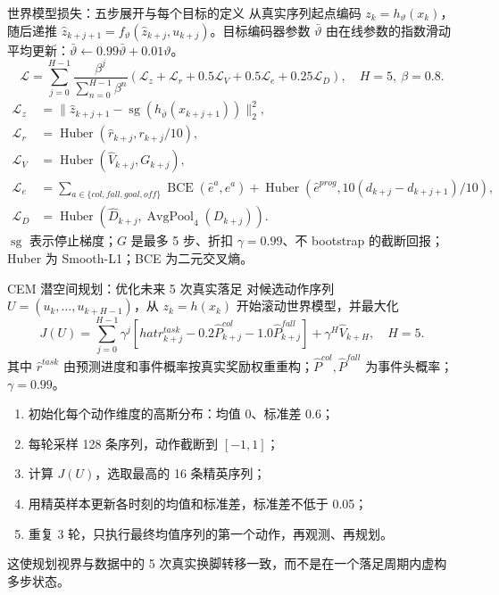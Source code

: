 \documentclass[aspectratio=169,10pt]{beamer}
\begin{document}
\begin{frame}{世界模型损失：五步展开与每个目标的定义}
\scriptsize
从真实序列起点编码 $z_k=h_\vartheta(x_k)$，随后递推 $\hat z_{k+j+1}=f_\vartheta(\hat z_{k+j},u_{k+j})$。目标编码器参数 $\bar\vartheta$ 由在线参数的指数滑动平均更新：$\bar\vartheta\leftarrow0.99\bar\vartheta+0.01\vartheta$。
\[
\mathcal L=\sum_{j=0}^{H-1}\frac{\beta^j}{\sum_{n=0}^{H-1}\beta^n}
\left(\mathcal L_z+\mathcal L_r+0.5\mathcal L_V+0.5\mathcal L_e+0.25\mathcal L_D\right),
\quad H=5,\ \beta=0.8.
\]
\begin{align*}
\mathcal L_z&=\|\hat z_{k+j+1}-\operatorname{sg}(h_{\bar\vartheta}(x_{k+j+1}))\|_2^2,\\
\mathcal L_r&=\operatorname{Huber}(\hat r_{k+j},r_{k+j}/10),\\
\mathcal L_V&=\operatorname{Huber}(\hat V_{k+j},G_{k+j}),\\
\mathcal L_e&=\sum_{a\in\{col,fall,goal,off\}}\operatorname{BCE}(\hat e^a,e^a)
+\operatorname{Huber}(\hat e^{prog},10(d_{k+j}-d_{k+j+1})/10),\\
\mathcal L_D&=\operatorname{Huber}(\hat D_{k+j},\operatorname{AvgPool}_{4}(D_{k+j})).
\end{align*}
$\operatorname{sg}$ 表示停止梯度；$G$ 是最多 5 步、折扣 $\gamma=0.99$、不 bootstrap 的截断回报；Huber 为 Smooth-L1；BCE 为二元交叉熵。
\end{frame}

\begin{frame}{CEM 潜空间规划：优化未来 5 次真实落足}
\scriptsize
对候选动作序列 $U=(u_k,\ldots,u_{k+H-1})$，从 $z_k=h(x_k)$ 开始滚动世界模型，并最大化
\[
J(U)=\sum_{j=0}^{H-1}\gamma^j\left[hat r_{k+j}^{task}
-0.2\hat P_{k+j}^{col}-1.0\hat P_{k+j}^{fall}\right]
+\gamma^H\hat V_{k+H},\quad H=5.
\]
其中 $\hat r^{task}$ 由预测进度和事件概率按真实奖励权重重构；$\hat P^{col},\hat P^{fall}$ 为事件头概率；$\gamma=0.99$。
\begin{enumerate}
  \item 初始化每个动作维度的高斯分布：均值 0、标准差 0.6；
  \item 每轮采样 128 条序列，动作截断到 $[-1,1]$；
  \item 计算 $J(U)$，选取最高的 16 条精英序列；
  \item 用精英样本更新各时刻的均值和标准差，标准差不低于 0.05；
  \item 重复 3 轮，只执行最终均值序列的第一个动作，再观测、再规划。
\end{enumerate}
这使规划视界与数据中的 5 次真实换脚转移一致，而不是在一个落足周期内虚构多步状态。
\end{frame}
\end{document}
